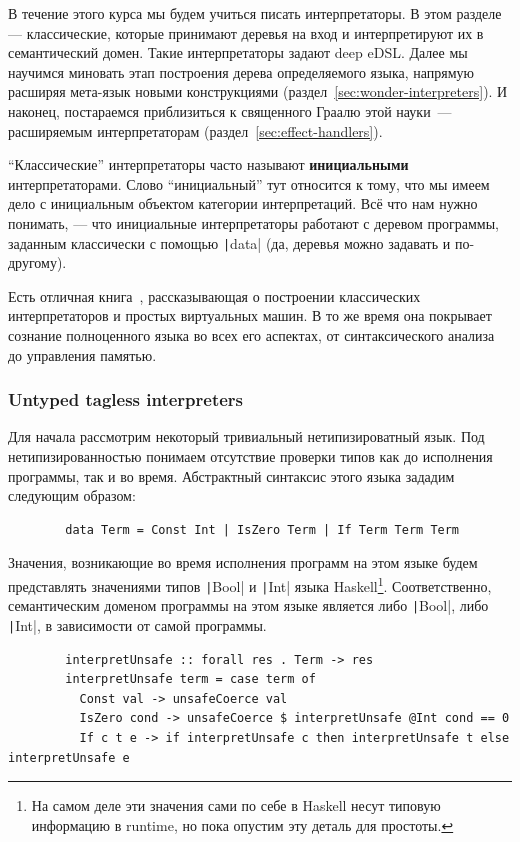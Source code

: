 \documentclass[12pt]{article}
\newcommand{\vocab}[1]{\textbf{#1}} %
\begin{document}
    В течение этого курса мы будем учиться писать интерпретаторы.
    В этом разделе --- классические, которые принимают деревья на вход и интерпретируют их в семантический домен.
    Такие интерпретаторы задают deep eDSL\@.
    Далее мы научимся миновать этап построения дерева определяемого языка, напрямую расширяя мета-язык новыми конструкциями (раздел~\ref{sec:wonder-interpreters}).
    И наконец, постараемся приблизиться к священного Граалю этой науки~--- расширяемым интерпретаторам (раздел~\ref{sec:effect-handlers}).

    ``Классические'' интерпретаторы часто называют \vocab{инициальными} интерпретаторами.
    Слово ``инициальный'' тут относится к тому, что мы имеем дело с инициальным объектом категории интерпретаций.
    Всё что нам нужно понимать, --- что инициальные интерпретаторы работают с деревом программы, заданным классически с помощью \texttt|data| (да, деревья можно задавать и по-другому).

    Есть отличная книга~\cite{nystrom2021crafting}, рассказывающая о построении классических интерпретаторов и простых виртуальных машин.
    В то же время она покрывает сознание полноценного языка во всех его аспектах, от синтаксического анализа до управления памятью.

    \subsubsection{Untyped tagless interpreters}

    Для начала рассмотрим некоторый тривиальный нетипизироватный язык.
    Под нетипизированностью понимаем отсутствие проверки типов как до исполнения программы, так и во время.
    Абстрактный синтаксис этого языка зададим следующим образом:
    \begin{verbatim}
        data Term = Const Int | IsZero Term | If Term Term Term
    \end{verbatim}

    Значения, возникающие во время исполнения программ на этом языке будем представлять значениями типов \texttt|Bool| и \texttt|Int| языка Haskell\footnote{На самом деле эти значения сами по себе в Haskell несут типовую информацию в runtime, но пока опустим эту деталь для простоты.}.
    Соответственно, семантическим доменом программы на этом языке является либо \texttt|Bool|, либо \texttt|Int|, в зависимости от самой программы.
    \begin{verbatim}
        interpretUnsafe :: forall res . Term -> res
        interpretUnsafe term = case term of
          Const val -> unsafeCoerce val
          IsZero cond -> unsafeCoerce $ interpretUnsafe @Int cond == 0
          If c t e -> if interpretUnsafe c then interpretUnsafe t else interpretUnsafe e
    \end{verbatim}
\end{document}
